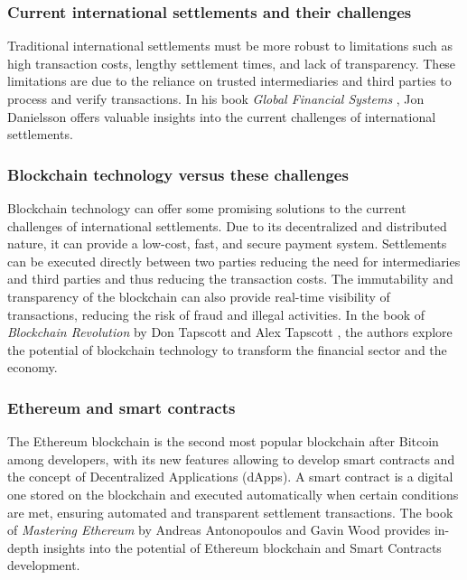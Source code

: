 \subsubsection{Current international settlements and their challenges}
Traditional international settlements must be more robust to limitations such as high transaction costs, lengthy settlement times, and lack of transparency. These limitations are due to the reliance on trusted intermediaries and third parties to process
and verify transactions. In his book \textit{Global Financial Systems} \cite{Danielsson2013-cw}, Jon Danielsson offers
valuable insights into the current challenges of international settlements.


\subsubsection{Blockchain technology versus these challenges}


Blockchain technology can offer some promising solutions to the current challenges of international settlements. Due to its decentralized and distributed nature, it can provide
a low-cost, fast, and secure payment system. Settlements can be executed directly
between two parties reducing the need for intermediaries and third parties and thus reducing the transaction costs. The immutability and
transparency of the blockchain can also provide real-time visibility of transactions, reducing the risk of fraud and illegal activities.
In the book of \textit{Blockchain Revolution} by Don Tapscott and Alex Tapscott \cite{Tapscott2018-ed}, the authors explore the potential of blockchain
technology to transform the financial sector and the economy.


\subsubsection{Ethereum and smart contracts}
The Ethereum blockchain is the second most popular blockchain after Bitcoin among developers, with its new features allowing to develop smart contracts and the concept of
Decentralized Applications (dApps). A smart contract is a digital one stored on the blockchain and executed automatically when certain conditions are met, ensuring automated
and transparent settlement transactions. The book of \textit{Mastering Ethereum} by Andreas Antonopoulos and Gavin Wood \cite{Antonopoulos2018-wp} provides
in-depth insights into the potential of Ethereum blockchain and Smart Contracts development.

